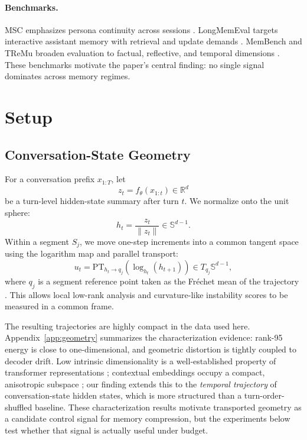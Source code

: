 \documentclass[11pt]{article}
\newcommand{\R}{\mathbb{R}}
\newcommand{\Sph}{\mathbb{S}}
\begin{document}
\paragraph{Benchmarks.}
MSC emphasizes persona continuity across sessions \cite{msc}. LongMemEval targets interactive assistant memory with retrieval and update demands \cite{longmemeval}. MemBench and TReMu broaden evaluation to factual, reflective, and temporal dimensions \cite{membench,tremu}. These benchmarks motivate the paper's central finding: no single signal dominates across memory regimes.

\section{Setup}
\subsection{Conversation-State Geometry}
For a conversation prefix $x_{1:T}$, let
\begin{equation}
z_t = f_\theta(x_{1:t}) \in \R^d
\end{equation}
be a turn-level hidden-state summary after turn $t$. We normalize onto the unit sphere:
\begin{equation}
h_t = \frac{z_t}{\lVert z_t \rVert} \in \Sph^{d-1}.
\end{equation}
Within a segment $S_j$, we move one-step increments into a common tangent space using the logarithm map and parallel transport:
\begin{equation}
u_t = \mathrm{PT}_{h_t \rightarrow q_j}\!\left(\log_{h_t}(h_{t+1})\right) \in T_{q_j}\Sph^{d-1},
\end{equation}
where $q_j$ is a segment reference point taken as the Fr\'{e}chet mean of the trajectory \cite{frechet-mean}. This allows local low-rank analysis and curvature-like instability scores to be measured in a common frame.

The resulting trajectories are highly compact in the data used here. Appendix~\ref{app:geometry} summarizes the characterization evidence: rank-95 energy \cite{effective-rank} is close to one-dimensional, and geometric distortion is tightly coupled to decoder drift. Low intrinsic dimensionality is a well-established property of transformer representations \cite{intrinsic-dim-objectives,intrinsic-dim-finetuning}; contextual embeddings occupy a compact, anisotropic subspace \cite{contextual-geometry,isotropy-clusters}; our finding extends this to the \emph{temporal trajectory} of conversation-state hidden states, which is more structured than a turn-order-shuffled baseline. These characterization results motivate transported geometry as a candidate control signal for memory compression, but the experiments below test whether that signal is actually useful under budget.
\end{document}
